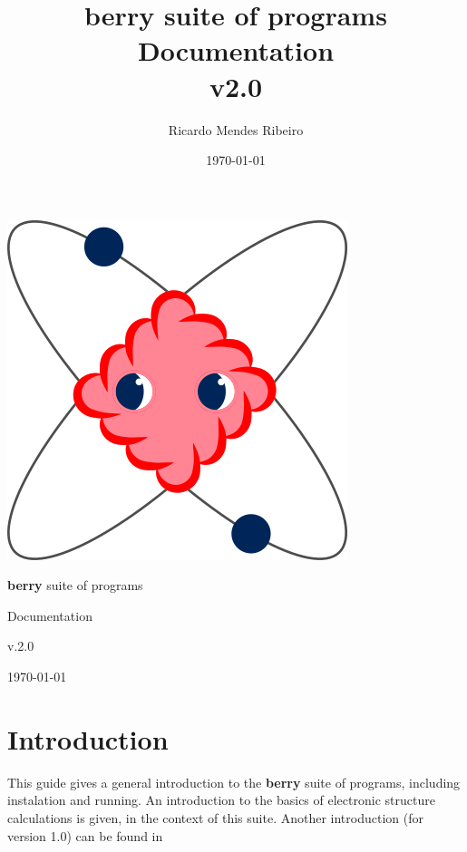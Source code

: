 \documentclass[a4paper,12pt]{report}
\title{{\bf berry} suite of programs\\
\large Documentation \\
v2.0}
\author{Ricardo Mendes Ribeiro}
\date{\today}
\begin{document}
\begin{titlepage}
 \begin{center}
 \includegraphics[scale=0.3,keepaspectratio=true]{figures/BerryLogo.png}
 \end{center}
\vspace*{2cm}

 \begin{center}
  \begin{Huge}{\bf berry} suite of programs\end{Huge}
  \vspace*{1cm}

 \begin{LARGE}Documentation\end{LARGE}
  \vspace*{1cm}

\begin{Huge}v.2.0\end{Huge}
  \vspace*{12cm}

\today
 \end{center}
\end{titlepage}

\tableofcontents

\chapter{Introduction}\label{ch:introduction}

 This guide gives a general introduction to the \textbf{berry} suite of programs, including instalation and running.
 An introduction to the basics of electronic structure calculations is given, in the context of this suite.
 Another introduction (for version 1.0) can be found in
  \medskip
\end{document}
